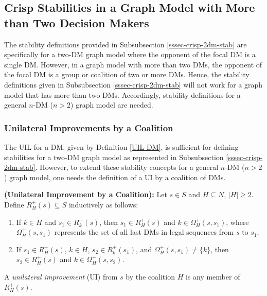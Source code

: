 
\subsection{Crisp Stabilities in a Graph Model with More than Two Decision Makers}

The stability definitions provided in Subsubsection \ref{sssec-crisp-2dm-stab} are specifically for a two-DM graph model where the opponent of the focal DM is a single DM. However, in a graph model with more than two DMs, the opponent of the focal DM is a group or coalition of two or more DMs. Hence, the stability definitions given in Subsubsection \ref{sssec-crisp-2dm-stab} will not work for a graph model that has more than two DMs. Accordingly, stability definitions for a general $n$-DM ($n>2$) graph model are needed.

\subsubsection{Unilateral Improvements by a Coalition}

The UIL for a DM, given by Definition \ref{UIL-DM}, is sufficient for defining stabilities for a two-DM graph model as represented in Subsubsection \ref{sssec-crisp-2dm-stab}. However, to extend these stability concepts for a general $n$-DM ($n>2$) graph model, one needs the definition of a UI by a coalition of DMs.

\begin{definition}\label{UI-coal}
\rm {\bf (Unilateral Improvement by a Coalition):} Let $s \in S$ and $H \subseteq N$, $|H| \geq 2$. Define $R_H^+(s) \subseteq S$ inductively as follows:
\begin{enumerate}[(1)]
\item If $k \in H$ and $s_1 \in R_k^+(s)$, then $s_1 \in R_H^+(s)$ and $k \in \Omega_H^+(s, s_1)$, where $\Omega_H^+(s, s_1)$ represents the set of all last DMs in legal sequences from $s$ to $s_1$;
\item If $s_1 \in R_H^+(s)$, $k \in H$, $s_2 \in R_k^+(s_1)$, and $\Omega_H^+(s, s_1) \not = \{k\}$, then $s_2 \in R_H^+(s)$ and $k \in \Omega_H^+(s, s_2)$.
\end{enumerate}
\noindent A \emph{unilateral improvement} (UI) from $s$ by the coalition $H$ is any member of $R_H^+(s)$.
\end{definition}

